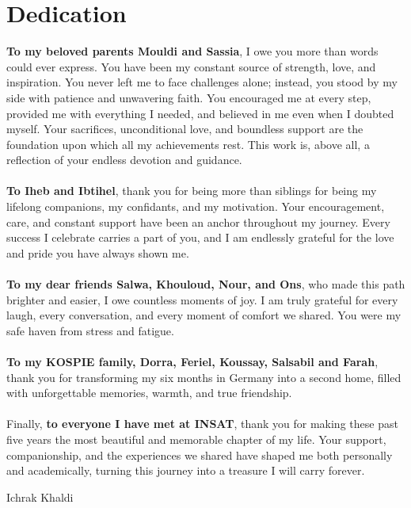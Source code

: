 \chapter*{Dedication}
\normalsize{}
\textbf{To my beloved parents Mouldi and Sassia},  
I owe you more than words could ever express. You have been my constant source of strength, love, and inspiration. You never left me to face challenges alone; instead, you stood by my side with patience and unwavering faith. You encouraged me at every step, provided me with everything I needed, and believed in me even when I doubted myself. Your sacrifices, unconditional love, and boundless support are the foundation upon which all my achievements rest. This work is, above all, a reflection of your endless devotion and guidance.  \\
\normalsize{}
\\
\textbf{To Iheb and Ibtihel},  
thank you for being more than siblings for being my lifelong companions, my confidants, and my motivation. Your encouragement, care, and constant support have been an anchor throughout my journey. Every success I celebrate carries a part of you, and I am endlessly grateful for the love and pride you have always shown me.  \\
\normalsize{}
\\
\textbf{To my dear friends Salwa, Khouloud, Nour, and Ons},  
who made this path brighter and easier, I owe countless moments of joy. I am truly grateful for every laugh, every conversation, and every moment of comfort we shared. You were my safe haven from stress and fatigue.  \\
\normalsize{}
\\
\textbf{To my KOSPIE family, Dorra, Feriel, Koussay, Salsabil and Farah},  
thank you for transforming my six months in Germany into a second home, filled with unforgettable memories, warmth, and true friendship.  \\
\normalsize{}
\\
Finally, \textbf{to everyone I have met at INSAT},  
thank you for making these past five years the most beautiful and memorable chapter of my life. Your support, companionship, and the experiences we shared have shaped me both personally and academically, turning this journey into a treasure I will carry forever. \\ 
\begin{flushright}
Ichrak Khaldi
\end{flushright}

